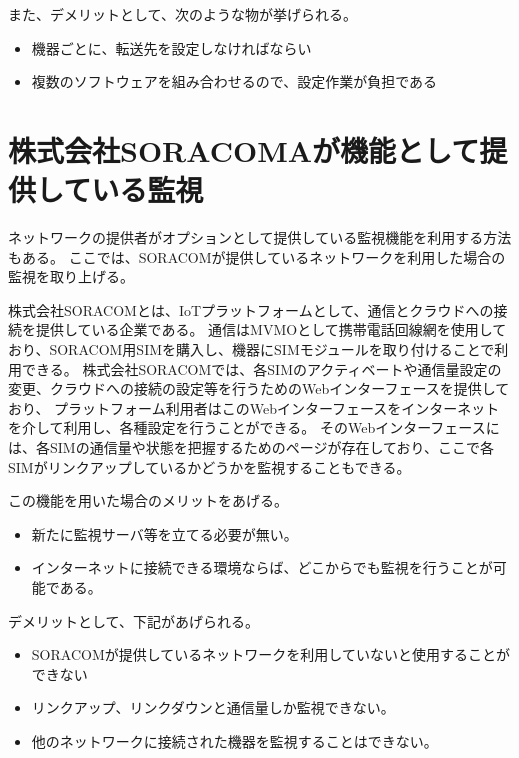 	また、デメリットとして、次のような物が挙げられる。
	\begin{itemize}
		\item 機器ごとに、転送先を設定しなければならい
		\item 複数のソフトウェアを組み合わせるので、設定作業が負担である
	\end{itemize}

\begin{comment}
	この形だと，機器監視サーバが監視対象のIPアドレスを覚えておく必要がなくなるため，監視対象が接続されるネットワークが切り替わった場合でも，追跡が可能である．
	ところが，エージェントプログラムの導入には，技術スキルと時間が必要である．
	また，サーバーの構築・設定も必要となる．
\end{comment}

\section{株式会社SORACOMAが機能として提供している監視} %
	ネットワークの提供者がオプションとして提供している監視機能を利用する方法もある。
	ここでは、SORACOMが提供しているネットワークを利用した場合の監視を取り上げる。
	
	株式会社SORACOMとは、IoTプラットフォームとして、通信とクラウドへの接続を提供している企業である。
	通信はMVMOとして携帯電話回線網を使用しており、SORACOM用SIMを購入し、機器にSIMモジュールを取り付けることで利用できる。
	株式会社SORACOMでは、各SIMのアクティベートや通信量設定の変更、クラウドへの接続の設定等を行うためのWebインターフェースを提供しており、
	プラットフォーム利用者はこのWebインターフェースをインターネットを介して利用し、各種設定を行うことができる。
	そのWebインターフェースには、各SIMの通信量や状態を把握するためのページが存在しており、ここで各SIMがリンクアップしているかどうかを監視することもできる。

	この機能を用いた場合のメリットをあげる。
	\begin{itemize}
		\item 新たに監視サーバ等を立てる必要が無い。
		\item インターネットに接続できる環境ならば、どこからでも監視を行うことが可能である。
	\end{itemize}

	デメリットとして、下記があげられる。
	\begin{itemize}
		\item SORACOMが提供しているネットワークを利用していないと使用することができない
		\item リンクアップ、リンクダウンと通信量しか監視できない。
		\item 他のネットワークに接続された機器を監視することはできない。
	\end{itemize}

